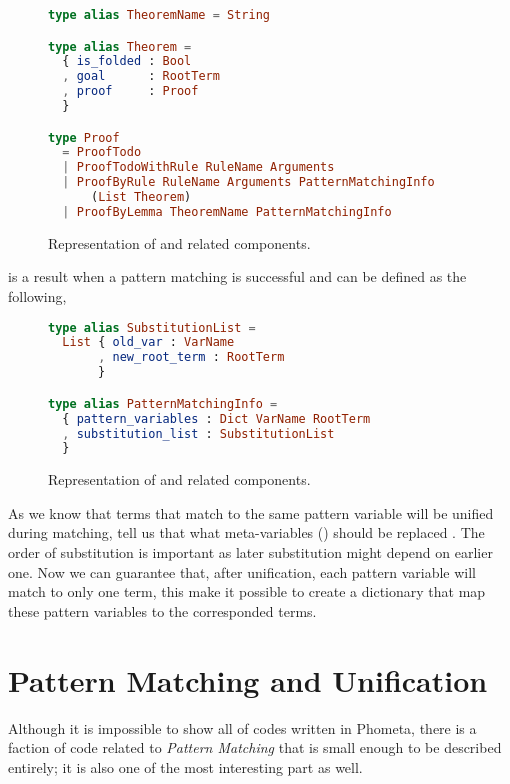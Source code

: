 \documentclass[master.tex]{subfiles}
\begin{document}
\vspace{-1.5em}

\begin{figure}[H]
\begin{framed}
\begin{lstlisting}[language=elm]
type alias TheoremName = String

type alias Theorem =
  { is_folded : Bool
  , goal      : RootTerm
  , proof     : Proof
  }

type Proof
  = ProofTodo
  | ProofTodoWithRule RuleName Arguments
  | ProofByRule RuleName Arguments PatternMatchingInfo
      (List Theorem)
  | ProofByLemma TheoremName PatternMatchingInfo
\end{lstlisting}
\end{framed}
\caption{Representation of  and related components.}
\label{fig:implementation-repo-theorem}
\end{figure}

 is a result when a pattern matching is successful
and can be defined as the following,


\begin{figure}[H]
\begin{framed}
\begin{lstlisting}[language=elm]
type alias SubstitutionList =
  List { old_var : VarName
       , new_root_term : RootTerm
       }

type alias PatternMatchingInfo =
  { pattern_variables : Dict VarName RootTerm
  , substitution_list : SubstitutionList
  }
\end{lstlisting}
\end{framed}
\caption{Representation of  and related components.}
\label{fig:implementation-repo-pattern-matching-info}
\end{figure}

As we know that terms that match to the same pattern variable will be unified
during matching,  tell us that what meta-variables
() should be replaced . The order of
substitution is important as later substitution might depend on earlier one. Now
we can guarantee that, after unification, each pattern variable will match to
only one term, this make it possible to create a dictionary
 that map these pattern variables to the corresponded
terms.

\section{Pattern Matching and Unification}
Although it is impossible to show all of codes written in Phometa, there is a
faction of code related to \emph{Pattern Matching} that is small enough to be
described entirely; it is also one of the most interesting part as well.
\end{document}

